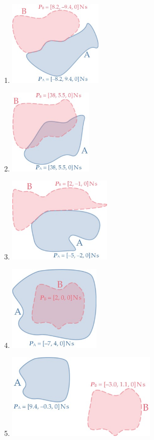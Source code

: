 \documentclass[a4paper,12pt,%
onecolumn,oneside,%
british%
]{memoir}
\renewcommand*{\|}[1][]{\nonscript\:#1\vert\nonscript\:\mathopen{}}
\begin{document}
\begin{enumerate}[exerc,itemsep=2ex]
\item \qquad \includegraphics[align=c,height=11em]{images/ex_AB_P0.jpg}%
\item \qquad \includegraphics[align=c,height=11em]{images/ex_AB_Pov.jpg}%
\item \qquad \includegraphics[align=c,height=11em]{images/ex_AB_P1.jpg}%
\item \qquad \includegraphics[align=c,height=11em]{images/ex_AB_Pin.jpg}%
\item \qquad \includegraphics[align=c,height=11em]{images/ex_AB_Pdi.jpg}%
\end{enumerate}
\end{document}
